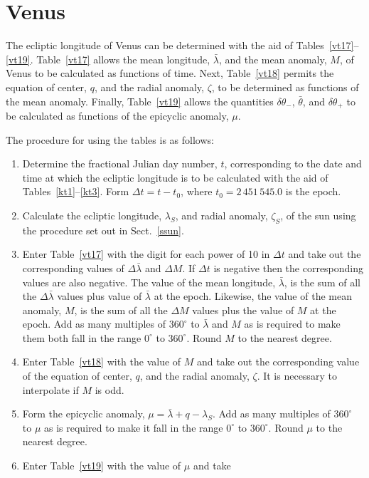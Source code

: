 \section{Venus}
The ecliptic longitude of Venus can be determined with the aid of Tables~\ref{vt17}--\ref{vt19}. Table~\ref{vt17} allows
the mean longitude, $\bar{\lambda}$, and the mean anomaly, $M$, of Venus to be calculated as functions of
time. Next, Table~\ref{vt18} permits the equation of center, $q$, and the radial anomaly, $\zeta$, to
be determined as functions of the mean anomaly. Finally, Table~\ref{vt19} allows the quantities
$\delta\theta_-$, $\bar{\theta}$, and $\delta\theta_+$ to be calculated as functions of the epicyclic
anomaly, $\mu$. 

The procedure for using the tables is as follows:
\begin{enumerate}
\item Determine the fractional Julian day number, $t$, corresponding to the date and time
at which the  ecliptic longitude is to be calculated  with the aid of Tables~\ref{kt1}--\ref{kt3}. Form $\Delta t = t-t_0$, where $t_0=2\,451\,545.0$ is the epoch. 
\item Calculate the ecliptic longitude, $\lambda_S$, and radial anomaly,
$\zeta_S$, of the sun using the procedure set out in Sect.~\ref{ssun}.
\item Enter Table~\ref{vt17} with the digit for each power of 10
in ${\Delta} t$ and take out the corresponding values of $\Delta\bar{\lambda}$ and $\Delta M$. If $\Delta t$ is negative then the corresponding
values are also negative.
The value of the mean longitude, $\bar{\lambda}$, is the
sum of all the $\Delta\bar{\lambda}$ values plus value of $\bar{\lambda}$ at the epoch. Likewise, the value of the mean anomaly, $M$, is
the sum of all the $\Delta M$ values plus the value of $M$ at the epoch. 
Add as many multiples of $360^\circ$ to $\bar{\lambda}$ and $M$
as is required to make them both fall in the range $0^\circ$ to $360^\circ$. Round $M$ to the nearest degree. 
\item Enter Table~\ref{vt18} with the value of $M$ and take out the
corresponding value of the equation of center, $q$, and the radial anomaly, $\zeta$. It is necessary to interpolate if $M$ is odd.
\item Form the epicyclic anomaly, $\mu = \bar{\lambda}+q-\lambda_S$. Add as many multiples of $360^\circ$ to $\mu$ as is required to make it fall in the range $0^\circ$ to $360^\circ$. Round $\mu$ to the nearest degree.
\item Enter Table~\ref{vt19} with the value of $\mu$ and take

\end{enumerate}
